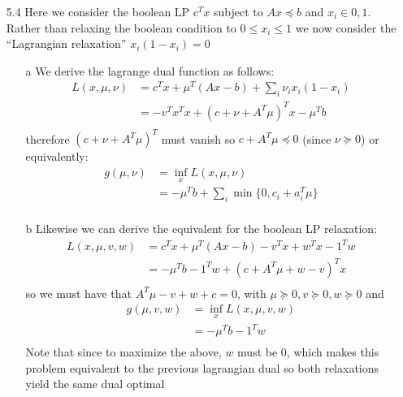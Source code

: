 \documentclass[12pt]{article}
\begin{document}
\begin{itemize}
  \item[5.4] Here we consider the boolean LP $c^T x$ subject to $Ax \preceq b$ and $x_i \in {0,1}$. Rather than relaxing the boolean condition to $0 \leq x_i \leq 1$ we now consider the ``Lagrangian relaxation'' $x_i (1-x_i) = 0$
    \begin{enumerate}
    \item[a] We derive the lagrange dual function as follows:
      $$
      \begin{alignat*}{1}
          L(x, \mu, \nu) & = c^Tx + \mu^T (Ax - b) + \sum_i \nu_i x_i (1 - x_i) \\
          & = -v^T x^Tx + (c + \nu + A^T\mu)^T x - \mu^Tb \\
        \end{alignat*}
        $$
        therefore $(c + \nu + A^T\mu)^T$ must vanish so $c + A^T \mu \preceq 0$ (since $\nu \succeq 0$) or equivalently:
      $$
      \begin{alignat*}{1}
          g(\mu, \nu) & = \inf_x L(x, \mu, \nu) \\
          & = - \mu^Tb + \sum_i \min \{0, c_i + a_i^T \mu\}  \\
        \end{alignat*}
        $$
      \item[b] Likewise we can derive the equivalent for the boolean LP relaxation:
      $$
      \begin{alignat*}{1}
          L(x, \mu, v, w) & = c^Tx + \mu^T (Ax - b) - v^Tx + w^Tx - 1^Tw \\
          & = -\mu^T b - 1^Tw + (c + A^T \mu + w - v)^Tx \\
        \end{alignat*}
        $$
        so we must have that $A^T \mu - v + w + c = 0$, with $\mu \succeq 0, v \succeq 0, w \succeq 0$ and
      $$
      \begin{alignat*}{1}
          g(\mu, v, w) & = \inf_x L(x, \mu, v, w) \\
          & = -\mu^T b - 1^Tw \\
        \end{alignat*}
        $$
        Note that since to maximize the above, $w$ must be $0$, which makes this problem equivalent to the previous lagrangian dual so both relaxations yield the same dual optimal
    \end{enumerate}


\end{itemize}
\end{document}
